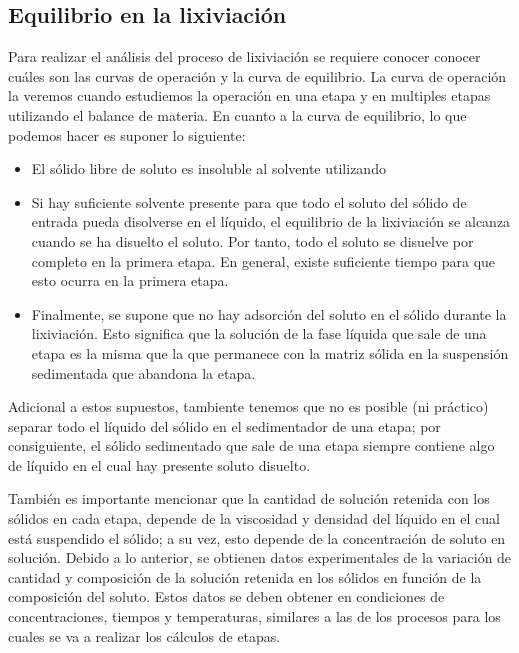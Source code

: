 \documentclass[11pt]{book}
\begin{document}
\subsection{Equilibrio en la lixiviación}

Para realizar el análisis del proceso de lixiviación se requiere conocer conocer cuáles son las curvas de operación y la curva de equilibrio. La curva de operación la veremos cuando estudiemos la operación en una etapa y en multiples etapas utilizando el balance de materia. En cuanto a la curva de equilibrio, lo que podemos hacer es suponer lo siguiente:

\begin{itemize}
    \item El sólido libre de soluto es insoluble al solvente utilizando
    
    \item Si hay suficiente solvente presente para que todo el soluto del sólido de entrada pueda disolverse en el líquido, el equilibrio de la lixiviación se alcanza cuando se ha disuelto el soluto. Por tanto, todo el soluto se disuelve por completo en la primera etapa. En general, existe suficiente tiempo para que esto ocurra en la primera etapa.
    
    \item Finalmente, se supone que no hay adsorción del soluto en el sólido durante la lixiviación. Esto significa que la solución de la fase líquida que sale de una etapa es la misma que la que permanece con la matriz sólida en la suspensión sedimentada que abandona la etapa.
    
\end{itemize}

Adicional a estos supuestos, tambiente tenemos que no es posible (ni práctico) separar todo el líquido del sólido en el sedimentador de una etapa; por consiguiente, el sólido sedimentado que sale de una etapa siempre contiene algo de líquido en el cual hay presente soluto disuelto. 

También es importante mencionar que la cantidad de solución retenida con los sólidos en cada etapa, depende de la viscosidad y densidad del líquido en el cual está suspendido el sólido; a su vez, esto depende de la concentración de soluto en solución. Debido a lo anterior, se obtienen datos experimentales de la variación de cantidad y composición de la solución retenida en los sólidos en función de la composición del soluto. Estos datos se deben obtener en condiciones de concentraciones, tiempos y temperaturas, similares a las de los procesos para los cuales se va a realizar los cálculos de etapas.
\end{document}
